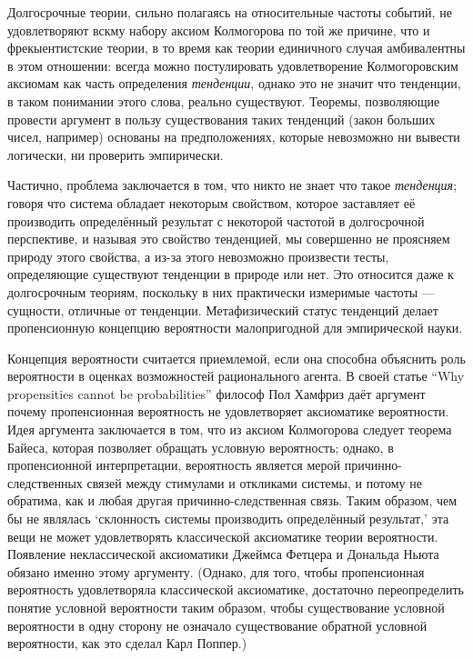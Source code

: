 \documentclass[14pt]{extarticle}
\begin{document}
Долгосрочные теории, сильно полагаясь на относительные частоты событий, не удовлетворяют вскму набору аксиом Колмогорова по той же причине, что и фрекыентистские теории, в то время как теории единичного случая амбивалентны в этом отношении: всегда можно постулировать удовлетворение Колмогоровским аксиомам как часть определения \emph{тенденции}, однако это не значит что тенденции, в таком понимании этого слова, реально существуют. Теоремы, позволяющие провести аргумент в пользу существования таких тенденций (закон больших чисел, например) основаны на предположениях, которые невозможно ни вывести логически, ни проверить эмпирически.

Частично, проблема заключается в том, что никто не знает что такое \emph{тенденция}; говоря что система обладает некоторым свойством, которое заставляет её производить определённый результат с некоторой частотой в долгосрочной перспективе, и называя это свойство тенденцией, мы совершенно не проясняем природу этого свойства, а из-за этого невозможно произвести тесты, определяющие существуют тенденции в природе или нет. Это относится даже к долгосрочным теориям, поскольку в них практически измеримые частоты --- сущности, отличные от тенденции. Метафизический статус тенденций делает пропенсионную концепцию вероятности малопригодной для эмпирической науки.

Концепция вероятности считается приемлемой, если она способна объяснить роль вероятности в оценках возможностей рационального агента. В своей статье ``Why propensities cannot be probabilities'' философ Пол Хамфриз даёт аргумент почему пропенсионная вероятность не удовлетворяет аксиоматике вероятности. Идея аргумента заключается в том, что из аксиом Колмогорова следует теорема Байеса, которая позволяет обращать условную вероятность; однако, в пропенсионной интерпретации, вероятность является мерой причинно-следственных связей между стимулами и откликами системы, и потому не обратима, как и любая другая причинно-следственная связь. Таким образом, чем бы не являлась `склонность системы производить определённый результат,' эта вещи не может удовлетворять классической аксиоматике теории вероятности. Появление неклассической аксиоматики Джеймса Фетцера и Дональда Ньюта обязано именно этому аргументу. (Однако, для того, чтобы пропенсионная вероятность удовлетворяла классической аксиоматике, достаточно переопределить понятие условной вероятности таким образом, чтобы существование условной вероятности в одну сторону не означало существование обратной условной вероятности, как это сделал Карл Поппер.)
\end{document}
